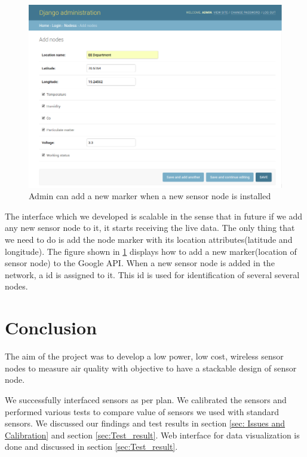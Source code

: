 \documentclass[a4paper,12pt]{article}
\begin{document}
\begin{figure}[!ht]
	\centering
	\includegraphics[scale=0.5]{adminpage.png}
	\caption{Admin can add a new marker when a new sensor node is installed\cite{Django}}
	\label{admin}
\end{figure}

The interface which we developed is scalable in the sense that in future if we add any new sensor node to it, it starts receiving the live data. The only thing that we need to do is add the node marker with its location attributes(latitude and longitude). The figure shown in \ref{admin} displays how to add a new marker(location of sensor node) to the Google API. When a new sensor node is added in the network, a id is assigned to it. This id is used for identification of several several nodes.


\newpage
\section{Conclusion}

The aim of the project was to develop a low power, low cost, wireless sensor nodes to measure air quality with objective to have a stackable design of sensor node. 

We successfully interfaced sensors as per plan. We calibrated the sensors and performed various tests to compare value of sensors we used with standard sensors. We discussed our findings and test results in section \ref{sec: Issues and Calibration} and section \ref{sec:Test_result}. Web interface for data visualization is done and discussed in section \ref{sec:Test_result}.
\end{document}
